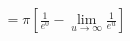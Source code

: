 \documentclass[preview]{standalone}
\begin{document}
\begin{align*}
= \pi [\frac{1}{e^0} - \lim_{u \to \infty} \frac{1}{e^u}]
\end{align*}
\end{document}
